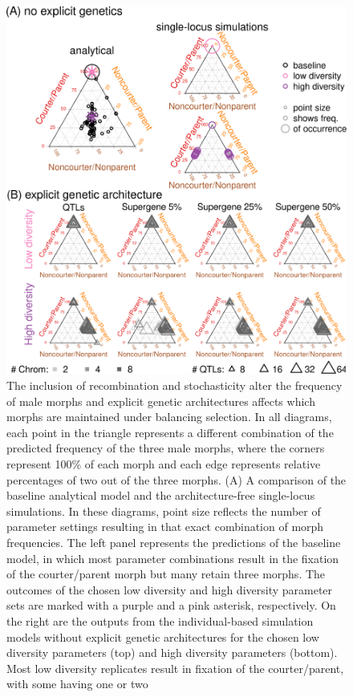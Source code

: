 \documentclass[
  11pt,
  a4paper,
]{article}
\begin{document}
\begin{figure}[H]
\includegraphics[width=0.9\linewidth,]{../figs/combinedTernaryTall-1} \caption{The inclusion of recombination and stochasticity alter
the frequency of male morphs and explicit genetic architectures affects
which morphs are maintained under balancing selection. In all diagrams,
each point in the triangle represents a different combination of the
predicted frequency of the three male morphs, where the corners
represent 100\% of each morph and each edge represents relative
percentages of two out of the three morphs. (A) A comparison of the
baseline analytical model and the architecture-free single-locus
simulations. In these diagrams, point size reflects the number of
parameter settings resulting in that exact combination of morph
frequencies. The left panel represents the predictions of the baseline
model, in which most parameter combinations result in the fixation of
the courter/parent morph but many retain three morphs. The outcomes of
the chosen low diversity and high diversity parameter sets are marked
with a purple and a pink asterisk, respectively. On the right are the
outputs from the individual-based simulation models without explicit
genetic architectures for the chosen low diversity parameters (top) and
high diversity parameters (bottom). Most low diversity replicates result
in fixation of the courter/parent, with some having one or two
}
\end{figure}
\end{document}
